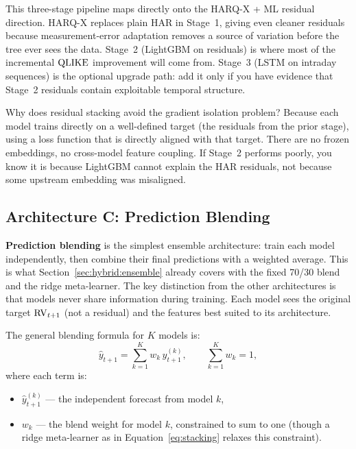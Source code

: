 \begin{projectconnection}
This three-stage pipeline maps directly onto the HARQ-X + ML residual
direction.  HARQ-X replaces plain HAR in Stage~1, giving even cleaner
residuals because measurement-error adaptation removes a source of
variation before the tree ever sees the data.  Stage~2 (LightGBM on
residuals) is where most of the incremental $\operatorname{QLIKE}$ improvement will
come from.  Stage~3 (LSTM on intraday sequences) is the optional
upgrade path: add it only if you have evidence that Stage~2 residuals
contain exploitable temporal structure.
\end{projectconnection}

Why does residual stacking avoid the gradient isolation problem?
Because each model trains directly on a well-defined target (the
residuals from the prior stage), using a loss function that is directly
aligned with that target.  There are no frozen embeddings, no
cross-model feature coupling.  If Stage~2 performs poorly, you know it
is because LightGBM cannot explain the HAR residuals, not because some
upstream embedding was misaligned.


\subsection{Architecture C: Prediction Blending}
\label{sec:hybrid:pred-blend}

\textbf{Prediction blending} is the simplest ensemble architecture:
train each model independently, then combine their final predictions
with a weighted average.  This is what
Section~\ref{sec:hybrid:ensemble} already covers with the fixed 70/30
blend and the ridge meta-learner.  The key distinction from the other
architectures is that models never share information during training.
Each model sees the original target $\operatorname{RV}_{t+1}$ (not a residual) and
the features best suited to its architecture.

The general blending formula for $K$ models is:
\begin{equation}\label{eq:pred-blend-general}
  \hat{y}_{t+1} = \sum_{k=1}^{K} w_k\,\hat{y}_{t+1}^{(k)},
  \qquad \sum_{k=1}^{K} w_k = 1,
\end{equation}
where each term is:
\begin{itemize}
  \item $\hat{y}_{t+1}^{(k)}$ --- the independent forecast from model $k$,
  \item $w_k$ --- the blend weight for model $k$, constrained to sum
        to one (though a ridge meta-learner as in
        Equation~\eqref{eq:stacking} relaxes this constraint).
\end{itemize}

